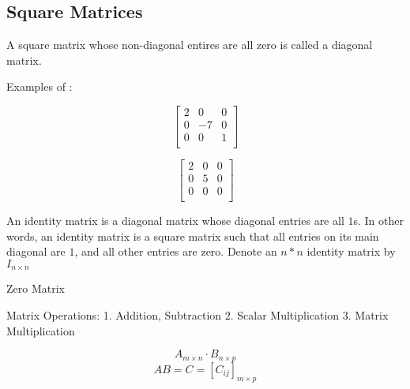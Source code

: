 \subsection{Square Matrices}


A square matrix whose non-diagonal entires are all zero is called a diagonal matrix.

Examples of :

\[
  \begin{bmatrix}
    2 & 0 & 0  \\
    0 & -7 & 0  \\
    0 & 0 & 1  \\
  \end{bmatrix}
\]

\[
  \begin{bmatrix}
    2 & 0 & 0  \\
    0 & 5 & 0  \\
    0 & 0 & 0  \\
  \end{bmatrix}
\]


An identity matrix is a diagonal matrix whose diagonal entries are all $1$s. In other words, an identity matrix is a square matrix such that all entries on its main diagonal are $1$, and all other entries are zero. Denote an $n * n$ identity matrix by $I_{n \times n}$

Zero Matrix

Matrix Operations:
1. Addition, Subtraction
2. Scalar Multiplication
3. Matrix Multiplication

\[ A_{m \times n} \cdot B_{n \times p} \]
\[ AB = C = [ C_{ij} ]_{m \times p} \]